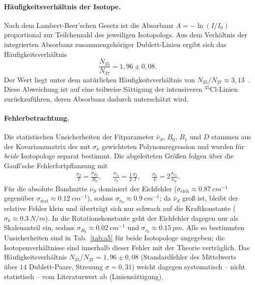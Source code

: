 \documentclass[11pt,a4paper]{article}
\begin{document}
\paragraph{Häufigkeitsverhältnis der Isotope.}
Nach dem Lambert-Beer'schen Gesetz ist die Absorbanz $A=-\ln(I/I_0)$ proportional
zur Teilchenzahl des jeweiligen Isotopologs. Aus dem Verhältnis der integrierten
Absorbanz zusammengehöriger Dublett-Linien ergibt sich das Häufigkeitsverhältnis
\begin{equation}
  \frac{N_{35}}{N_{37}} = 1{,}96 \pm 0{,}08 .
\end{equation}
Der Wert liegt unter dem natürlichen Häufigkeitsverhältnis von
$N_{35}/N_{37} \approx 3{,}13$~\cite{Rinsland}. Diese Abweichung ist auf eine
teilweise Sättigung der intensiveren $^{35}\mathrm{Cl}$-Linien zurückzuführen,
deren Absorbanz dadurch unterschätzt wird.

\paragraph{Fehlerbetrachtung.}
Die statistischen Unsicherheiten der Fitparameter $\bar\nu_S$, $B_0$, $B_1$ und
$D$ stammen aus der Kovarianzmatrix der mit $\sigma_{\bar\nu}$ gewichteten
Polynomregression und wurden für \emph{beide} Isotopologe separat bestimmt. Die
abgeleiteten Größen folgen über die Gauß'sche Fehlerfortpflanzung mit
\begin{align*}
  \frac{\sigma_I}{I}=\frac{\sigma_{B_0}}{B_0}, &&
  \frac{\sigma_{r_0}}{r_0}=\tfrac12\frac{\sigma_I}{I}, &&
  \frac{\sigma_k}{k}=2\frac{\sigma_{\bar\nu_S}}{\bar\nu_S} .
\end{align*}
Für die absolute Bandmitte $\bar\nu_S$ dominiert der Eichfehler
($\sigma_\mathrm{eich}\approx\SI{0.87}{cm^{-1}}$ gegenüber
$\sigma_\mathrm{stat}\approx\SI{0.12}{cm^{-1}}$), sodass
$\sigma_{\bar\nu_S}\approx\SI{0.9}{cm^{-1}}$; da $\bar\nu_S$ groß ist, bleibt der
relative Fehler klein und überträgt sich nur schwach auf die Kraftkonstante
($\sigma_k\approx\SI{0.3}{N/m}$). In die Rotationskonstante geht der Eichfehler
dagegen nur als Skalenanteil ein, sodass $\sigma_{B_0}\approx\SI{0.02}{cm^{-1}}$
und $\sigma_{r_0}\approx\SI{0.15}{pm}$. Alle so bestimmten Unsicherheiten sind in
Tab.~\ref{tab:a5} für beide Isotopologe angegeben; die Isotopenverhältnisse sind
innerhalb dieser Fehler mit der Theorie verträglich. Das
Häufigkeitsverhältnis $N_{35}/N_{37}=1{,}96\pm0{,}08$ (Standardfehler des
Mittelwerts über $14$ Dublett-Paare, Streuung $\sigma=0{,}31$) weicht dagegen
systematisch -- nicht statistisch -- vom Literaturwert ab (Liniensättigung).
\end{document}
